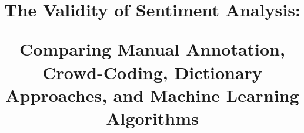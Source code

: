 \documentclass[jou,11pt]{apa6}
\title{The Validity of Sentiment Analysis:\par Comparing Manual Annotation, Crowd-Coding, Dictionary Approaches, and Machine Learning Algorithms}
\begin{document}
 
\maketitle












\newpage

{\footnotesize}
\end{document}
